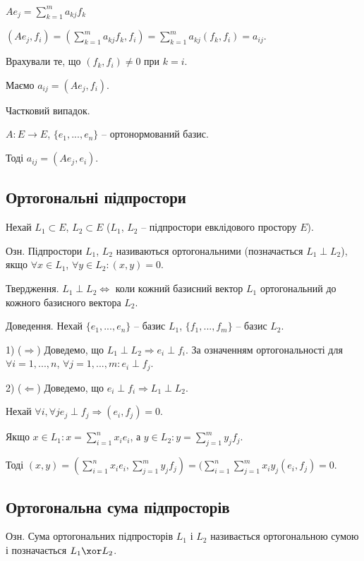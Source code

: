 $A e_j = \sum\limits_{k=1}^m a_{kj} f_k$

$(A e_j, f_i)
= (\sum\limits_{k=1}^m a_{kj} f_k, f_i)
= \sum\limits_{k=1}^m a_{kj} (f_k, f_i)
= a_{ij}$.

Врахували те, що $(f_k, f_i) \neq 0$ при $k = i$.

Маємо $a_{ij} = (A e_j, f_i)$.

Частковий випадок.

$A: E \rightarrow E$, $\{e_1, ..., e_n\}$ -- ортонормований базис.

Тоді $a_{ij} = (A e_j, e_i)$.

\subsection*{Ортогональні підпростори} %

Нехай $L_1 \subset E$, $L_2 \subset E$ ($L_1$, $L_2$ -- підпростори евклідового простору $E$).

Озн. Підпростори $L_1$, $L_2$ називаються ортогональними (позначається $L_1 \perp L_2$),
якщо $\forall x \in L_1$, $\forall y \in L_2: (x,y) = 0$.

Твердження. $L_1 \perp L_2 \Leftrightarrow$ коли кожний базисний вектор $L_1$ ортогональний до
кожного базисного вектора $L_2$.
 

Доведення.
Нехай $\{e_1, ..., e_n\}$ -- базис $L_1$, $\{f_1, ..., f_m\}$ -- базис $L_2$.

1) ($\Rightarrow$) Доведемо, що $L_1 \perp L_2 \Rightarrow e_i \perp f_i$.
За означенням ортогональності для $\forall i = 1, ..., n$, $\forall j = 1, ..., m: e_i \perp f_j$.

2) ($\Leftarrow$) Доведемо, що $e_i \perp f_i \Rightarrow L_1 \perp L_2$.

Нехай $\forall i, \forall j e_j \perp f_j \Rightarrow (e_i, f_j) = 0$.

Якщо $x \in L_1: x = \sum\limits_{i=1}^n x_i e_i$, а $y \in L_2: y = \sum\limits_{j=1}^m y_j f_j$.

Тоді $(x,y)
= (\sum\limits_{i=1}^n x_i e_i, \sum\limits_{j=1}^m y_j f_j)
= (\sum\limits_{i=1}^n \sum\limits_{j=1}^m x_i y_j( e_i, f_j)
= 0.$

\subsection*{Ортогональна сума підпросторів}

Озн. Сума ортогональних підпросторів $L_1$ і $L_2$ називається ортогональною
сумою і позначається $L_1 \xor L_2$.

